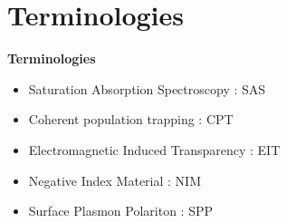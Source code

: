\documentclass[9pt,aspectratio94]{beamer}
\begin{document}
\section{\textbf{Terminologies}}
\begin{frame} {\textbf{Terminologies}}
\begin{tcolorbox} [width=10cm,arc=3mm,colframe=blue!10!black]

\begin{itemize}
    \item Saturation Absorption Spectroscopy : SAS
   \end{itemize}
    \end{tcolorbox}
\begin{tcolorbox}[width=10cm, arc=3mm, colback=blue!5!white]
\begin{itemize}
  
    \item Coherent population trapping : CPT
  

\end{itemize}
    
\end{tcolorbox}

\begin{tcolorbox} [width=10cm,arc=3mm,colframe=blue!10!black]

\begin{itemize}
   
    \item Electromagnetic Induced Transparency : EIT

\end{itemize}
    
\end{tcolorbox}
\begin{tcolorbox}[width=10cm, arc=3mm, colback=blue!5!white]
\begin{itemize}
 
    \item Negative Index Material : NIM
    
\end{itemize}
    
\end{tcolorbox}
\begin{tcolorbox} [width=10cm,arc=3mm,colframe=blue!10!black]

\begin{itemize}
  
    \item Surface Plasmon Polariton : SPP
\end{itemize}
    \end{tcolorbox}

\end{frame}
\end{document}
